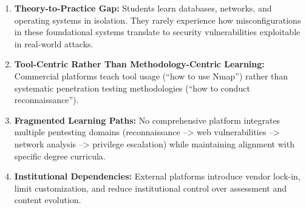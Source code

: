 \begin{enumerate}

\item \textbf{Theory-to-Practice Gap:} Students learn databases, networks, and operating 
systems in isolation. They rarely experience how misconfigurations in these foundational 
systems translate to security vulnerabilities exploitable in real-world attacks.

\item \textbf{Tool-Centric Rather Than Methodology-Centric Learning:} Commercial platforms 
teach tool usage (``how to use Nmap'') rather than systematic penetration testing methodologies 
(``how to conduct reconnaissance'').

\item \textbf{Fragmented Learning Paths:} No comprehensive platform integrates multiple 
pentesting domains (reconnaissance --> web vulnerabilities --> network analysis --> privilege 
escalation) while maintaining alignment with specific degree curricula.

\item \textbf{Institutional Dependencies:} External platforms introduce vendor lock-in, 
limit customization, and reduce institutional control over assessment and content evolution.

\end{enumerate}
